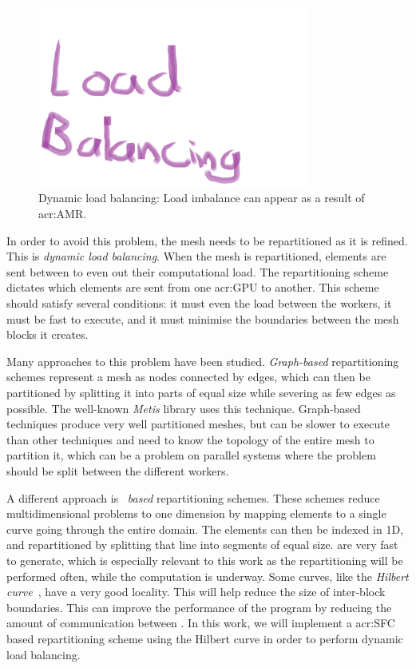 \begin{figure}[H]
	\centering
	\includegraphics[width=0.8\textwidth]{Chapter_introduction/media/dynamic_load_balancing}
	\caption{Dynamic load balancing: Load imbalance can appear as a result of \acrshort{acr:AMR}.}\label{fig:intro_load_balancing}
\end{figure}

In order to avoid this problem, the mesh needs to be repartitioned as it is refined. This is
\textit{dynamic load balancing}. When the mesh is repartitioned, elements are sent between
 to even out their computational load. The repartitioning scheme dictates which
elements are sent from one \acrshort{acr:GPU} to another. This scheme should satisfy several
conditions: it must even the load between the workers, it must be fast to execute, and it must
minimise the boundaries between the mesh blocks it creates. 

Many approaches to this problem have been studied. \textit{Graph-based} repartitioning schemes
represent a mesh as nodes connected by edges, which can then be partitioned by splitting it into
parts of equal size while severing as few edges as possible. The well-known
\textit{Metis}\cite{Karypis1998} library uses this technique. Graph-based techniques produce very
well partitioned meshes, but can be slower to execute than other techniques and need to know the
topology of the entire mesh to partition it, which can be a problem on parallel systems where the
problem should be split between the different workers.

A different approach is ~\textit{based} repartitioning schemes. These schemes
reduce multidimensional problems to one dimension by mapping elements to a single curve going
through the entire domain\cite{Peano1890}. The elements can then be indexed in 1D, and repartitioned
by splitting that line into segments of equal size.  are very fast to generate,
which is especially relevant to this work as the repartitioning will be performed often, while the
computation is underway. Some curves, like the \textit{Hilbert curve}~\cite{Hilbert1891}, have a
very good locality. This will help reduce the size of inter-block boundaries. This can improve the
performance of the program by reducing the amount of communication between . In
this work, we will implement a \acrshort{acr:SFC} based repartitioning scheme using the Hilbert
curve in order to perform dynamic load balancing.

